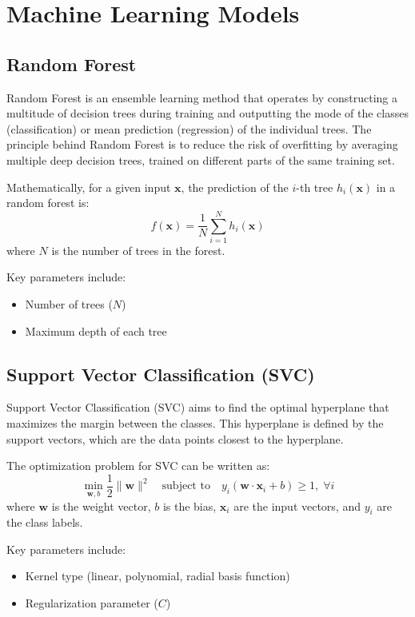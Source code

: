 \section{Machine Learning Models}
\subsection{Random Forest}
Random Forest is an ensemble learning method that operates by constructing a multitude of decision trees during training and outputting the mode of the classes (classification) or mean prediction (regression) of the individual trees. The principle behind Random Forest is to reduce the risk of overfitting by averaging multiple deep decision trees, trained on different parts of the same training set.

Mathematically, for a given input $\mathbf{x}$, the prediction of the $i$-th tree $h_i(\mathbf{x})$ in a random forest is:
\[
f(\mathbf{x}) = \frac{1}{N} \sum_{i=1}^N h_i(\mathbf{x})
\]
where $N$ is the number of trees in the forest.

Key parameters include:
\begin{itemize}
    \item Number of trees ($N$)
    \item Maximum depth of each tree
\end{itemize}

\subsection{Support Vector Classification (SVC)}

Support Vector Classification (SVC) aims to find the optimal hyperplane that maximizes the margin between the classes. This hyperplane is defined by the support vectors, which are the data points closest to the hyperplane.

The optimization problem for SVC can be written as:
\[
\min_{\mathbf{w}, b} \frac{1}{2} \|\mathbf{w}\|^2 \quad \text{subject to} \quad y_i (\mathbf{w} \cdot \mathbf{x}_i + b) \geq 1, \; \forall i
\]
where $\mathbf{w}$ is the weight vector, $b$ is the bias, $\mathbf{x}_i$ are the input vectors, and $y_i$ are the class labels.

Key parameters include:
\begin{itemize}
    \item Kernel type (linear, polynomial, radial basis function)
    \item Regularization parameter ($C$)
\end{itemize}

